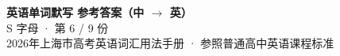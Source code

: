 \documentclass[10pt,a4paper]{article}
\begin{document}
\pagestyle{plain}

\begin{center}
{\LARGE\bfseries 英语单词默写 \quad 参考答案（中 $\to$ 英）}\\[0.22em]
{\large S 字母 · 第 6 / 9 份}\\[0.18em]
{\small 2026年上海市高考英语词汇用法手册 · 参照普通高中英语课程标准}
\end{center}

\vspace{0.2em}
\noindent{\color{rulegray}\rule{\textwidth}{0.8pt}}

\vspace{0.35em}

\vspace{0.25em}
\renewcommand{\arraystretch}{1.32}
\end{document}
